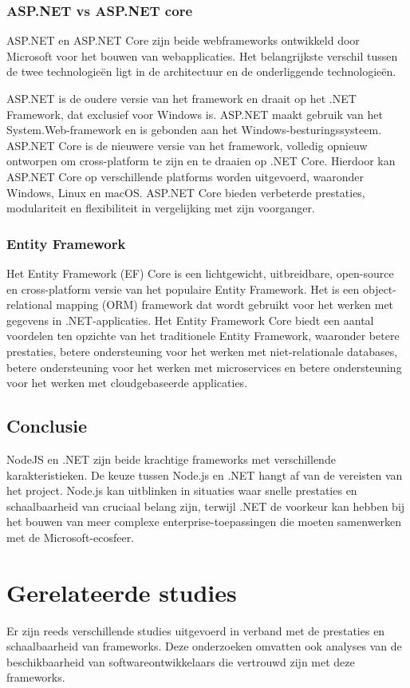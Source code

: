 \subsubsection*{ASP.NET vs ASP.NET core}%
ASP.NET en ASP.NET Core zijn beide webframeworks ontwikkeld door Microsoft voor het bouwen van webapplicaties. Het belangrijkste verschil tussen de twee technologieën ligt in de architectuur en de onderliggende technologieën.

ASP.NET is de oudere versie van het framework en draait op het .NET Framework,
dat exclusief voor Windows is. ASP.NET maakt gebruik van het
System.Web-framework en is gebonden aan het Windows-besturingssysteem.
\smallbreak
ASP.NET Core is de nieuwere versie van het framework, volledig opnieuw ontworpen om cross-platform te zijn en te draaien op .NET Core.
Hierdoor kan ASP.NET Core op verschillende platforms worden uitgevoerd,
waaronder Windows, Linux en macOS. ASP.NET Core bieden verbeterde prestaties,
modulariteit en flexibiliteit in vergelijking met zijn voorganger.

\subsubsection*{Entity Framework}%
Het Entity Framework (EF) Core is een lichtgewicht, uitbreidbare, open-source en cross-platform versie van het populaire Entity Framework. Het is een object-relational mapping (ORM) framework dat wordt gebruikt voor het werken met gegevens in .NET-applicaties. Het Entity Framework Core biedt een aantal voordelen ten opzichte van het traditionele Entity Framework, waaronder betere prestaties, betere ondersteuning voor het werken met niet-relationale databases, betere ondersteuning voor het werken met microservices en betere ondersteuning voor het werken met cloudgebaseerde applicaties.\autocite{Microsoft2024}

\subsection*{Conclusie}%
NodeJS en .NET zijn beide krachtige frameworks met verschillende
karakteristieken. De keuze tussen Node.js en .NET hangt af van de vereisten van
het project. Node.js kan uitblinken in situaties waar snelle prestaties en
schaalbaarheid van cruciaal belang zijn, terwijl .NET de voorkeur kan hebben
bij het bouwen van meer complexe enterprise-toepassingen die moeten samenwerken
met de Microsoft-ecosfeer.\autocite{Hutsulyak2023}

\section*{Ge\-rel\-at\-eerde studies}%
Er zijn reeds verschillende studies uitgevoerd in verband met de pre\-sta\-ties en schaalbaarheid van frameworks\autocite{Daityari2023}.  Deze onderzoeken omvatten ook analyses van de beschikbaarheid van soft\-ware\-ont\-wik\-kel\-aars die vertrouwd zijn met deze frameworks.

